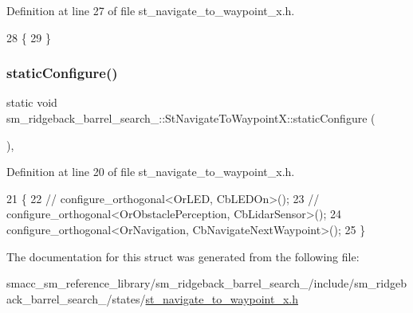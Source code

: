 Definition at line 27 of file st\+\_\+navigate\+\_\+to\+\_\+waypoint\+\_\+x.\+h.


\begin{DoxyCode}
28         \{
29         \}
\end{DoxyCode}
\mbox{\label{structsm__ridgeback__barrel__search__2_1_1StNavigateToWaypointX_a11a0404b21e1627d2e59fb675f8eff93}} 
\subsubsection{\texorpdfstring{static\+Configure()}{staticConfigure()}}
{\footnotesize\ttfamily static void sm\+\_\+ridgeback\+\_\+barrel\+\_\+search\+\_\+::\+St\+Navigate\+To\+Waypoint\+X\+::static\+Configure (\begin{DoxyParamCaption}{ }\end{DoxyParamCaption})\hspace{0.3cm}{\ttfamily [inline]}, {\ttfamily [static]}}



Definition at line 20 of file st\+\_\+navigate\+\_\+to\+\_\+waypoint\+\_\+x.\+h.


\begin{DoxyCode}
21         \{
22             \textcolor{comment}{// configure\_orthogonal<OrLED, CbLEDOn>();}
23             \textcolor{comment}{// configure\_orthogonal<OrObstaclePerception, CbLidarSensor>();}
24             configure\_orthogonal<OrNavigation, CbNavigateNextWaypoint>();
25         \}
\end{DoxyCode}


The documentation for this struct was generated from the following file\+:\begin{DoxyCompactItemize}
\item 
smacc\+\_\+sm\+\_\+reference\+\_\+library/sm\+\_\+ridgeback\+\_\+barrel\+\_\+search\+\_/include/sm\+\_\+ridgeback\+\_\+barrel\+\_\+search\+\_/states/\hyperlink{sm__ridgeback__barrel__search__2_2include_2sm__ridgeback__barrel__search__2_2states_2st__navigate__to__waypoint__x_8h}{st\+\_\+navigate\+\_\+to\+\_\+waypoint\+\_\+x.\+h}\end{DoxyCompactItemize}
